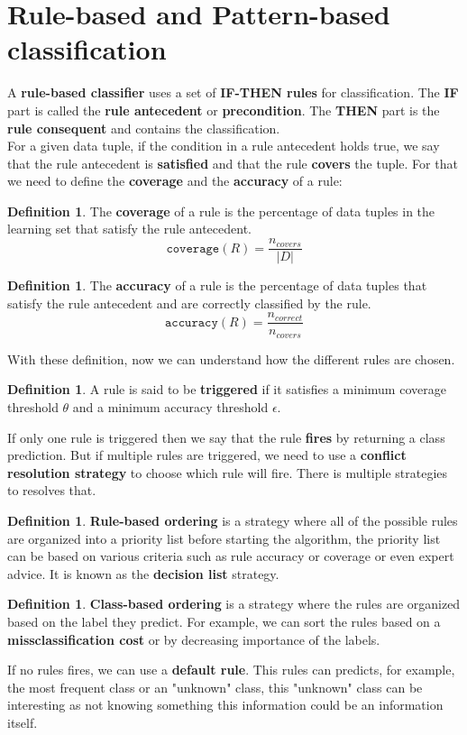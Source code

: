 \documentclass[12pt, openany]{report}
\theoremstyle{definition}
\newtheorem{definition}[thm]{Definition}
\begin{document}
\section{Rule-based and Pattern-based classification}
A \textbf{rule-based classifier} uses a set of \textbf{IF-THEN rules} for classification. The \textbf{IF} part is called the \textbf{rule antecedent} or \textbf{precondition}. The \textbf{THEN} part is the \textbf{rule consequent} and contains the
classification.\\
For a given data tuple, if the condition in a rule antecedent holds true, we say that the rule antecedent is \textbf{satisfied} and that the rule \textbf{covers} the tuple. For that we need to define the \textbf{coverage} and the \textbf{accuracy} of a rule:
\begin{definition}
    The \textbf{coverage} of a rule is the percentage of data tuples in the learning set that satisfy the rule antecedent.
    \begin{equation}
        \texttt{coverage}(R) = \frac{n_{covers}}{|D|}
    \end{equation}
\end{definition}
\begin{definition}
    The \textbf{accuracy} of a rule is the percentage of data tuples that satisfy the rule antecedent and are correctly classified by the rule.
    \begin{equation}
        \texttt{accuracy}(R) = \frac{n_{correct}}{n_{covers}}
    \end{equation}
\end{definition}
With these definition, now we can understand how the different rules are chosen.
\begin{definition}
    A rule is said to be \textbf{triggered} if it satisfies a minimum coverage threshold $\theta$ and a minimum accuracy threshold $\epsilon$.
\end{definition}
If only one rule is triggered then we say that the rule \textbf{fires} by returning a class prediction. But if multiple rules are triggered, we need to use a \textbf{conflict resolution strategy} to choose which rule will fire. There is multiple strategies to resolves that.
\begin{definition}
    \textbf{Rule-based ordering} is a strategy where all of the possible rules are organized into a priority list before starting the algorithm, the priority list can be based on various criteria such as rule accuracy or coverage or even expert advice. It is known as the \textbf{decision list} strategy. 
\end{definition}
\begin{definition}
    \textbf{Class-based ordering} is a strategy where the rules are organized based on the label they predict. For example, we can sort the rules based on a \textbf{missclassification cost} or by decreasing importance of the labels.
\end{definition}
If no rules fires, we can use a \textbf{default rule}. This rules can predicts, for example, the most frequent class or an "unknown" class, this "unknown" class can be interesting as not knowing something this information could be an information itself.\\
\end{document}
